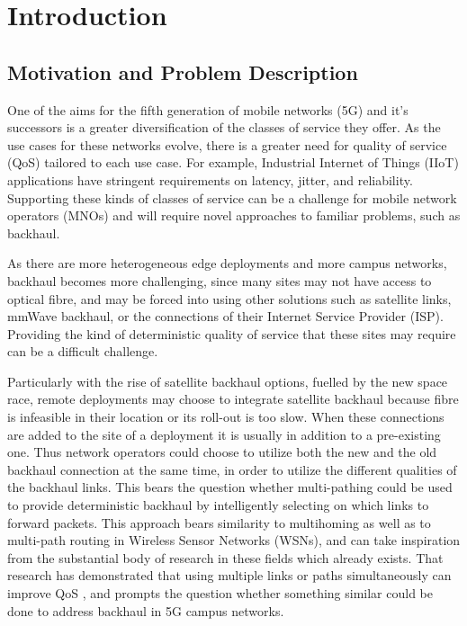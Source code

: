 
\cleardoublepage
\chapter{Introduction}

\label{cha:introduction}

\section{Motivation and Problem Description}
\label{sec:motivation}

One of the aims for the fifth generation of mobile networks (5G) and it's successors is a greater diversification of the classes of service they offer. As the use cases for these networks evolve, there is a greater need for quality of service (QoS) tailored to each use case. For example, Industrial Internet of Things (IIoT) applications have stringent requirements on latency, jitter, and reliability. Supporting these kinds of classes of service can be a challenge for mobile network operators (MNOs) and will require novel approaches to familiar problems, such as backhaul.

As there are more heterogeneous edge deployments and more campus networks, backhaul becomes more challenging, since many sites may not have access to optical fibre, and may be forced into using other solutions such as satellite links, mmWave backhaul, or the connections of their Internet Service Provider (ISP). Providing the kind of deterministic quality of service that these sites may require can be a difficult challenge.

Particularly with the rise of satellite backhaul options, fuelled by the new space race, remote deployments may choose to integrate satellite backhaul because fibre is infeasible in their location or its roll-out is too slow. When these connections are added to the site of a deployment it is usually in addition to a pre-existing one. Thus network operators could choose to utilize both the new and the old backhaul connection at the same time, in order to utilize the different qualities of the backhaul links. This bears the question whether multi-pathing could be used to provide deterministic backhaul by intelligently selecting on which links to forward packets. This approach bears similarity to multihoming as well as to multi-path routing in Wireless Sensor Networks (WSNs), and can take inspiration from the substantial body of research in these fields which already exists. That research has demonstrated that using multiple links or paths simultaneously can improve QoS \cite{akella2003measurement, tao2005improving, habib2007improving, goldenberg2004optimizing, huang2008multiconstrained, akella2008performance}, and prompts the question whether something similar could be done to address backhaul in 5G campus networks.



